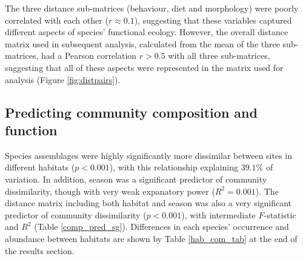 \documentclass[12pt,a4paper]{article}\usepackage[]{graphicx}\usepackage[]{color}
\begin{document}
The three distance sub-matrices (behaviour, diet and morphology) were poorly correlated with each other ($r \approx 0.1$), suggesting that these variables captured different aspects of species' functional ecology. 
However, the overall distance matrix used in subsequent analysis, calculated from the mean of the three sub-matrices, had a Pearson correlation $r > 0.5$ with all three sub-matrices, suggesting that all of these aspects were represented in the matrix used for analysis (Figure \ref{fig:distpairs}).

\clearpage
\subsection{Predicting community composition and function}



Species assemblages were highly significantly more dissimilar between sites in different habitats ($p < 0.001$), with this relationship explaining $39.1$\% of variation. In addition, season was a significant predictor of community dissimilarity, though with very weak expanatory power ($R^2 = 0.001$). The distance matrix including both habitat and season was also a very significant predictor of community dissimilarity ($p < 0.001$), with intermediate $F$-statistic and $R^2$ (Table \ref{comp_pred_sg}). Differences in each species' occurrence and abundance between habitats are shown by Table \ref{hab_com_tab} at the end of the results section.
\end{document}
